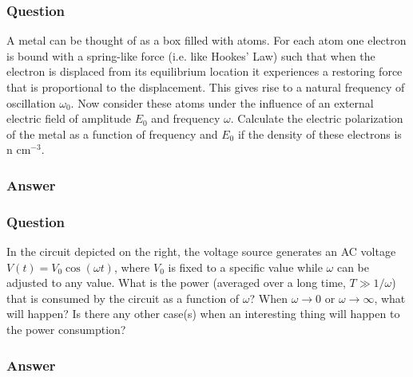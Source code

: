 \subsubsection{Question}
A metal can be thought of as a box filled with atoms. For each atom one electron is bound with a spring-like force (i.e. like Hookes' Law) such that when the electron is displaced from its equilibrium location it experiences a restoring force that is proportional to the displacement. This gives rise to a natural frequency of oscillation $\omega_0$. Now consider these atoms under the influence of an external electric field of amplitude $E_0$ and frequency $\omega$. Calculate the electric polarization of the metal as a function of frequency and $E_0$ if the density of these electrons is n cm$^{-­3}$.
\subsubsection{Answer}



\subsubsection{Question}
In the circuit depicted on the right, the voltage source generates an AC voltage $V(t)=V_0\cos(\omega t)$, where $V_0$ is fixed to a specific value while $\omega$ can be adjusted to any value. What is the power (averaged over a long time, $T\gg1/\omega$) that is consumed by the circuit as a function of $\omega$? When $\omega\to0$ or $\omega\to\infty$, what will happen? Is there any other case(s) when an interesting thing will happen to the power consumption?
\subsubsection{Answer}



